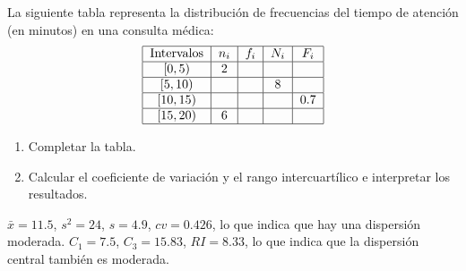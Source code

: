 {La siguiente tabla representa la distribución de frecuencias del tiempo de atención (en minutos) en una consulta médica: 
\[
\begin{tabular}{|c|c|c|c|c|}
\hline
Intervalos & $n_{i}$ & $f_{i}$ & $N_{i}$ & $F_{i}$ \\ \hline
$\left[ 0,5\right) $ & 2 &  &  &  \\ \hline
$\left[ 5,10\right) $ &  &  & 8 &  \\ \hline
$\left[ 10,15\right) $ &  &  &  & 0.7 \\ \hline
$\left[ 15,20\right) $ & 6 &  &  &  \\ \hline
\end{tabular}
\]
\begin{enumerate}
\item Completar la tabla.
\item Calcular el coeficiente de variación y el rango intercuartílico e interpretar los resultados.
\end{enumerate}
}
{$\bar x= 11.5$, $s^2= 24$, $s=4.9$, $cv=0.426$, lo que indica que hay una dispersión moderada. $C_1=7.5$, $C_3=15.83$, $RI=8.33$, lo que indica que la dispersión central también es moderada.
}
{}


